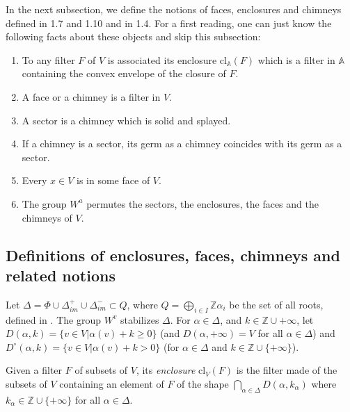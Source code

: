 \documentclass[12pt]{article}
\theoremstyle{plain}
\theoremstyle{definition}
\newcommand{\Z}{\mathbb{Z}}
\begin{document}
In the next subsection, we define the notions of faces, enclosures and chimneys defined in \cite{rousseau2011masures} 1.7 and 1.10 and in  \cite{gaussent2014spherical} 1.4. For a first reading, one can just know the following facts about these objects and skip this subsection:

\begin{enumerate}

\item To any filter $F$ of $V$ is associated its enclosure $\mathrm{cl}_{\mathbb{A}}(F)$ which is a filter in $\mathbb{A}$ containing the convex envelope of the closure of $F$.

\item A face or a chimney is a filter in $V$.



\item A sector is a chimney which is solid and splayed.

\item If a chimney is a sector, its germ as a chimney coincides with its germ as a sector. 


\item Every $x\in V\mathrm{}$ is in some face of $V$.




\item The group $W^a$ permutes the sectors, the enclosures, the faces and the chimneys of $V$.\label{fait sur les faces}

\end{enumerate}


\subsection{Definitions of enclosures, faces, chimneys and related notions}


Let $\Delta=\Phi\cup\Delta_{im}^+\cup\Delta_{im}^-\subset Q$, where $Q=\bigoplus_{i\in I}\Z\alpha_i$ be the set of all roots, defined in  \cite{kac1994infinite}. The group $W^v$ stabilizes $\Delta$. For $\alpha\in \Delta$, and $k\in \Z\cup{+\infty}$, let $D(\alpha,k)=\{v\in V| \alpha(v)+k\geq 0\}$ (and $D(\alpha,+\infty)=V\mathrm{}$ for all $\alpha\in \Delta$) and $D^\circ(\alpha,k)=\{v\in V| \alpha(v)+k > 0\}$ (for $\alpha\in \Delta$ and $k\in \Z\cup\{+\infty\}$).

Given a filter $F$ of subsets of $V$, its \textit{enclosure} $\mathrm{cl}_V\mathrm{}(F)$ is the filter made of the subsets of $V$ containing an element of $F$ of the shape $\bigcap_{\alpha\in \Delta}D(\alpha,k_\alpha)$ where $k_\alpha\in \Z\cup\{+\infty\}$ for all $\alpha\in \Delta$.
\end{document}
